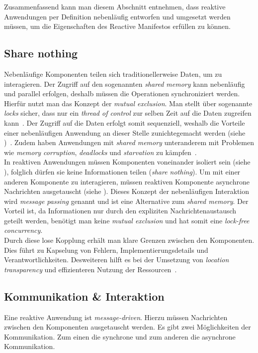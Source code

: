 Zusammenfassend kann man diesem Abschnitt entnehmen, dass reaktive Anwendungen per Definition nebenläufig entworfen und umgesetzt werden müssen, um die Eigenschaften des Reactive Manifestos erfüllen zu können.

\pagebreak

\subsection{Share nothing}\label{subsec:sharenothing}
Nebenläufige Komponenten teilen sich traditionellerweise Daten, um zu interagieren. Der Zugriff auf den sogenannten \textit{shared memory} kann nebenläufig und parallel erfolgen, deshalb müssen die Operationen synchroniziert werden. Hierfür nutzt man das Konzept der \textit{mutual exclusion}. Man stellt über sogenannte \textit{locks} sicher, dass nur ein \textit{thread of control} zur selben Zeit auf die Daten zugreifen kann~\cite[S.~10]{butcher_seven_2014}. Der Zugriff auf die Daten erfolgt somit sequenziell, weshalb die Vorteile einer nebenläufigen Anwendung an dieser Stelle zunichtegemacht werden (siehe )~\cite[S.~45]{kuhn_reactive_2015}. Zudem haben Anwendungen mit \textit{shared memory} unteranderem mit Problemen wie \textit{memory corruption}, \textit{deadlocks} und \textit{starvation} zu kämpfen~\cite[S.~117]{vernon_reactive_2016}.\\
In reaktiven Anwendungen müssen Komponenten voneinander isoliert sein (siehe ), folglich dürfen sie keine Informationen teilen (\textit{share nothing}). Um mit einer anderen Komponente zu interagieren, müssen reaktiven Komponente asynchrone Nachrichten ausgetauscht (siehe ). Dieses Konzept der nebenläufigen Interaktion wird \textit{message passing} genannt und ist eine Alternative zum \textit{shared memory}. Der Vorteil ist, da Informationen nur durch den expliziten Nachrichtenaustausch geteilt werden, benötigt man keine \textit{mutual exclusion} und hat somit eine \textit{lock-free concurrency}.\\
Durch diese lose Kopplung erhält man klare Grenzen zwischen den Komponenten. Dies führt zu Kapselung von Fehlern, Implementierungsdetails und Verantwortlichkeiten. Desweiteren hilft es bei der Umsetzung von \textit{location transparency} und effizienteren Nutzung der Ressourcen~\cite[S.~45]{kuhn_reactive_2015}.

\pagebreak

\subsection{Kommunikation \& Interaktion}
Eine reaktive Anwendung ist \textit{message-driven}. Hierzu müssen Nachrichten zwischen den Komponenten ausgetauscht werden. Es gibt zwei Möglichkeiten der Kommunikation. Zum einen die synchrone und zum anderen die asynchrone Kommunikation.

